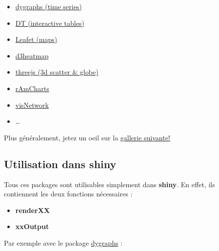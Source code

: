 \documentclass[
]{article}
\newenvironment{Shaded}{\begin{snugshade}}{\end{snugshade}}
\newcommand{\AttributeTok}[1]{\textcolor[rgb]{0.13,0.29,0.53}{#1}}
\newcommand{\CommentTok}[1]{\textcolor[rgb]{0.56,0.35,0.01}{\textit{#1}}}
\newcommand{\FunctionTok}[1]{\textcolor[rgb]{0.13,0.29,0.53}{\textbf{#1}}}
\newcommand{\NormalTok}[1]{#1}
\newcommand{\OtherTok}[1]{\textcolor[rgb]{0.56,0.35,0.01}{#1}}
\newcommand{\SpecialCharTok}[1]{\textcolor[rgb]{0.81,0.36,0.00}{\textbf{#1}}}
\newcommand{\StringTok}[1]{\textcolor[rgb]{0.31,0.60,0.02}{#1}}
\providecommand{\tightlist}{%
  \setlength{\itemsep}{0pt}\setlength{\parskip}{0pt}}
\begin{document}
\begin{itemize}
\tightlist
\item
  \href{http://rstudio.github.io/dygraphs/}{dygraphs (time series)}
\item
  \href{http://rstudio.github.io/DT/}{DT (interactive tables)}
\item
  \href{http://rstudio.github.io/leaflet/}{Leafet (maps)}
\item
  \href{https://github.com/rstudio/d3heatmap}{d3heatmap}
\item
  \href{http://bwlewis.github.io/rthreejs}{threejs (3d scatter \&
  globe)}
\item
  \href{http://datastorm-open.github.io/introduction_ramcharts/}{rAmCharts}
\item
  \href{http://datastorm-open.github.io/visNetwork}{visNetwork}
\item
  \ldots{}
\end{itemize}

Plus généralement, jetez un oeil sur la
\href{http://gallery.htmlwidgets.org/}{gallerie suivante!}

\hypertarget{utilisation-dans-shiny}{%
\subsection{Utilisation dans shiny}\label{utilisation-dans-shiny}}

Tous ces packages sont utilisables simplement dans \textbf{shiny}. En
effet, ils contiennent les deux fonctions nécessaires :

\begin{itemize}
\tightlist
\item
  \textbf{renderXX}
\item
  \textbf{xxOutput}
\end{itemize}

Par exemple avec le package
\href{http://rstudio.github.io/dygraphs/}{dygraphs} :

\begin{Shaded}
\end{Shaded}
\end{document}
